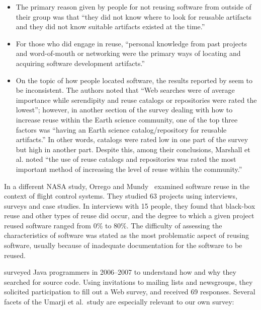 \documentclass[review]{elsarticle}
\begin{document}
\begin{itemize}

\item The primary reason given by people for not reusing software from outside of their group was that ``they did not know where to look for reusable artifacts and they did not know suitable artifacts existed at the time.''

\item For those who did engage in reuse, ``personal knowledge from past projects and word-of-mouth or networking were the primary ways of locating and acquiring software development artifacts.''  

\item On the topic of how people located software, the results reported by \citet{marshall2006software} seem to be inconsistent.  The authors noted that ``Web searches were of average importance while serendipity and reuse catalogs or repositories were rated the lowest''; however, in another section of the survey dealing with how to increase reuse within the Earth science community, one of the top three factors was ``having an Earth science catalog/repository for reusable artifacts.''  In other words, catalogs were rated low in one part of the survey but high in another part.  Despite this, among their conclusions, Marshall et al. noted ``the use of reuse catalogs and repositories was rated the most important method of increasing the level of reuse within the community.''

\end{itemize}

In a different NASA study, Orrego and Mundy~\citep{orrego_2007_study} examined software reuse in the context of flight control systems.  They studied 63 projects using interviews, surveys and case studies.  In interviews with 15 people, they found that black-box reuse and other types of reuse did occur, and the degree to which a given project reused software ranged from 0\% to 80\%.  The difficulty of assessing the characteristics of software was stated as the most problematic aspect of reusing software, usually because of inadequate documentation for the software to be reused.

\citet{umarji_2008} \citep[also discussed in ref.][]{umarji_2013} surveyed Java programmers in 2006--2007 to understand how and why they searched for source code.  Using invitations to mailing lists and newsgroups, they solicited participation to fill out a Web survey, and received 69 responses.  Several facets of the Umarji et al.\ study are especially relevant to our own survey:
\end{document}
